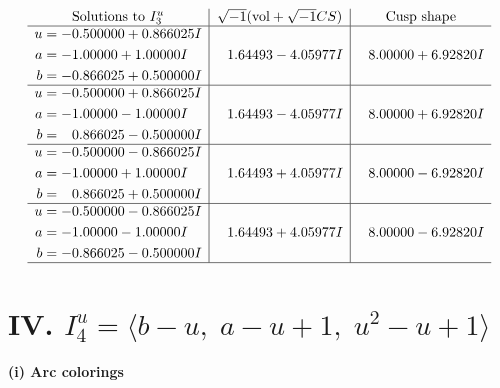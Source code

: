 \documentclass[1p]{elsarticle_modified}
\theoremstyle{definition}
\newcommand{\I}{\sqrt{-1}}
\begin{document}
$$\begin{array}{c|c|c}  
\text{Solutions to }I^u_{3}& \I (\text{vol} + \sqrt{-1}CS) & \text{Cusp shape}\\
 \hline 
\begin{aligned}
u &= -0.500000 + 0.866025 I \\
a &= -1.00000 + 1.00000 I \\
b &= -0.866025 + 0.500000 I\end{aligned}
 & \phantom{-}1.64493 - 4.05977 I & \phantom{-}8.00000 + 6.92820 I \\ \hline\begin{aligned}
u &= -0.500000 + 0.866025 I \\
a &= -1.00000 - 1.00000 I \\
b &= \phantom{-}0.866025 - 0.500000 I\end{aligned}
 & \phantom{-}1.64493 - 4.05977 I & \phantom{-}8.00000 + 6.92820 I \\ \hline\begin{aligned}
u &= -0.500000 - 0.866025 I \\
a &= -1.00000 + 1.00000 I \\
b &= \phantom{-}0.866025 + 0.500000 I\end{aligned}
 & \phantom{-}1.64493 + 4.05977 I & \phantom{-}8.00000 - 6.92820 I \\ \hline\begin{aligned}
u &= -0.500000 - 0.866025 I \\
a &= -1.00000 - 1.00000 I \\
b &= -0.866025 - 0.500000 I\end{aligned}
 & \phantom{-}1.64493 + 4.05977 I & \phantom{-}8.00000 - 6.92820 I\\
 \hline 
 \end{array}$$\newpage\newpage\renewcommand{\arraystretch}{1}
\centering \section*{IV. $I^u_{4}= \langle b- u,\;a- u+1,\;u^2- u+1 \rangle$}
\flushleft \textbf{(i) Arc colorings}\\
\end{document}
